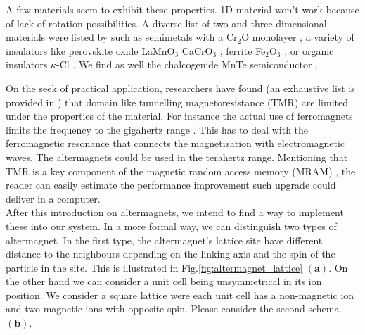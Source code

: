 \documentclass[../main.tex]{main.tex}
\begin{document}

A few materials seem to exhibit these properties. 1D material won't work because of lack of rotation possibilities. A diverse list of two and three-dimensional 
materials were listed by \cite{Smejkal2022} such as semimetals with a Cr$_2$O monolayer \cite{Chen_2023}, a variety of insulators like 
 perovskite oxide LaMnO$_3$ \cite{Yuan2021} CaCrO$_3$ \cite{Naka2021}, ferrite  Fe$_2$O$_3$ \cite{Smejkal2022_2}, or organic insulators $\kappa$-Cl \cite{Naka2019}.
We find as well the chalcogenide MnTe semiconductor \cite{Smejkal2022_2}.

On the seek of practical application, researchers have found (an exhaustive list is provided in \cite{Mazin2024}) that
domain like tunnelling magnetoresistance (TMR) are limited under the properties of the material. For instance the actual use 
of ferromagnets limits the frequency to the gigahertz range .
This has to deal with the ferromagnetic resonance that connects 
the magnetization with electromagnetic waves. The altermagnets could be used in the terahertz range.
Mentioning that TMR is a key component of the magnetic random access memory (MRAM) \cite{OSullivan2004}\cite{Yadav2022}, the reader can easily estimate the performance
improvement such upgrade could deliver in a computer.\\
 
After this introduction on altermagnets, we intend to find a way to implement these into our system. In a more formal way, we can
distinguish two types of altermagnet.
In the first type, the altermagnet's lattice site have different distance to the neighbours depending on the linking axis and the 
spin of the particle in the site. This is illustrated in Fig.\ref{fig:altermagnet_lattice} $(\bm{a})$. On the other hand we can consider a unit cell being unsymmetrical
in its ion position. We consider a square lattice were each unit cell has a non-magnetic ion and two magnetic ions with opposite spin.
Please consider the second schema $(\bm{b})$.\\
\end{document}
